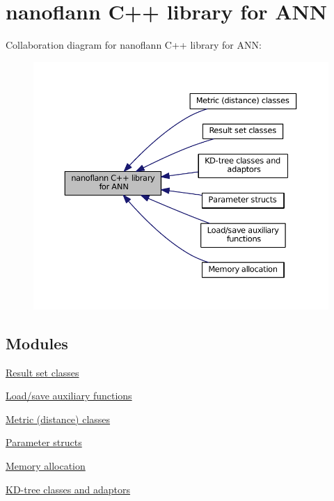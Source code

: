 \hypertarget{group__nanoflann__grp}{\section{nanoflann C++ library for A\-N\-N}
\label{group__nanoflann__grp}
}
Collaboration diagram for nanoflann C++ library for A\-N\-N\-:\nopagebreak
\begin{figure}[H]
\begin{center}
\leavevmode
\includegraphics[width=350pt]{group__nanoflann__grp}
\end{center}
\end{figure}
\subsection*{Modules}
\begin{DoxyCompactItemize}
\item 
\hyperlink{group__result__sets__grp}{Result set classes}
\item 
\hyperlink{group__loadsave__grp}{Load/save auxiliary functions}
\item 
\hyperlink{group__metric__grp}{Metric (distance) classes}
\item 
\hyperlink{group__param__grp}{Parameter structs}
\item 
\hyperlink{group__memalloc__grp}{Memory allocation}
\item 
\hyperlink{group__kdtrees__grp}{K\-D-\/tree classes and adaptors}
\end{DoxyCompactItemize}
